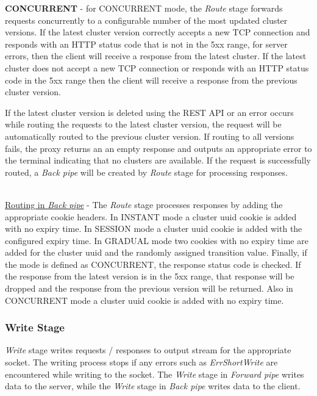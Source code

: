 \documentclass[a4paper,11pt,twoside]{report}
\begin{document}
\begin{list}{-}{}
   \item{\textbf{CONCURRENT}} - for CONCURRENT mode, the \textit{Route} stage forwards requests concurrently to a configurable number of the most updated cluster versions.  If the latest cluster version correctly accepts a new TCP connection and responds with an HTTP status code that is not in the 5xx range, for server errors, then the client will receive a response from the latest cluster.  If the latest cluster does not accept a new TCP connection or responds with an HTTP status code in the 5xx range then the client will receive a response from the previous cluster version.  
   
\end{list}

\noindent
If the latest cluster version is deleted using the REST API or an error occurs while routing the requests to the latest cluster version, the request will be automatically routed to the previous cluster version. If routing to all versions fails, the proxy returns an an empty response and outputs an appropriate error to the terminal indicating that no clusters are available. If the request is successfully routed, a \textit{Back pipe} will be created by \textit{Route} stage for processing responses.   

\noindent\\
\underline{Routing in \textit{Back pipe}} - The \textit{Route} stage processes responses by adding the appropriate cookie headers.  In INSTANT mode a cluster uuid cookie is added with no expiry time.  In SESSION mode a cluster uuid cookie is added with the configured expiry time.  In GRADUAL mode two cookies with no expiry time are added for the cluster uuid and the randomly assigned transition value.  Finally, if the mode is defined as CONCURRENT, the response status code is checked. If the response from the latest version is in the 5xx range, that response will be dropped and the response from the previous version will be returned.  Also in CONCURRENT mode a cluster uuid cookie is added with no expiry time.\bigskip

\subsubsection*{Write Stage} 
\textit{Write} stage writes requests / responses to output stream for the appropriate socket. The writing process stops if any errors such as \textit{ErrShortWrite} are encountered while writing to the socket. The \textit{Write} stage in \textit{Forward pipe} writes data to the server, while the \textit{Write} stage in \textit{Back pipe} writes data to the client. 
\end{document}

